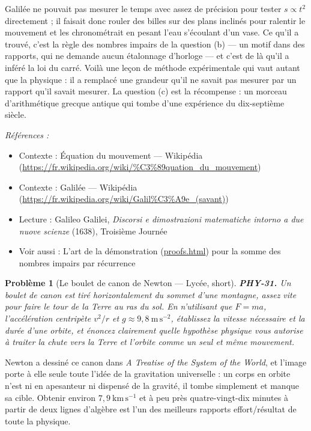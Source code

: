 \documentclass[11pt]{article}
\newtheorem{problem}{Problème}
\newenvironment{refs}{\par\small\noindent\emph{Références :}\begin{itemize}\setlength\itemsep{0pt}}{\end{itemize}\normalsize}
\begin{document}
\noindent Galilée ne pouvait pas mesurer le temps avec assez de précision pour tester
$ s \propto t^{2} $ directement ; il faisait donc rouler des billes sur des plans inclinés pour
ralentir le mouvement et les chronométrait en pesant l'eau s'écoulant d'un vase. Ce qu'il a
trouvé, c'est la règle des nombres impairs de la question (b) --- un motif dans des rapports, qui
ne demande aucun étalonnage d'horloge --- et c'est de là qu'il a inféré la loi du carré. Voilà une
leçon de méthode expérimentale qui vaut autant que la physique : il a remplacé une grandeur qu'il
ne savait pas mesurer par un rapport qu'il savait mesurer. La question (c) est la récompense : un
morceau d'arithmétique grecque antique qui tombe d'une expérience du dix-septième siècle.

\begin{refs}
\item Contexte : Équation du mouvement --- Wikipédia (\url{https://fr.wikipedia.org/wiki/%C3%89quation_du_mouvement})
\item Contexte : Galilée --- Wikipédia (\url{https://fr.wikipedia.org/wiki/Galil%C3%A9e_(savant)})
\item Lecture : Galileo Galilei, \textit{Discorsi e dimostrazioni matematiche intorno a due nuove scienze} (1638), Troisième Journée
\item Voir aussi : L'art de la démonstration (\url{proofs.html}) pour la somme des nombres impairs par récurrence
\end{refs}

\bigskip

\begin{problem}[{Le boulet de canon de Newton --- Lycée, short}]
\textbf{PHY-31.} Un boulet de canon est tiré horizontalement du sommet d'une
montagne, assez vite pour faire le tour de la Terre au ras du sol. En n'utilisant que
$ F = ma $, l'accélération centripète $ v^{2}/r $ et $ g \approx 9{,}8\ \mathrm{m\,s^{-2}} $,
établissez la vitesse nécessaire et la durée d'une orbite, et énoncez clairement quelle hypothèse
physique vous autorise à traiter la chute vers la Terre et l'orbite comme un seul et même
mouvement.
\end{problem}

\noindent Newton a dessiné ce canon dans \textit{A Treatise of the System of the World},
et l'image porte à elle seule toute l'idée de la gravitation universelle : un corps en orbite
n'est ni en apesanteur ni dispensé de la gravité, il tombe simplement et manque sa cible. Obtenir
environ $ 7{,}9\ \mathrm{km\,s^{-1}} $ et à peu près quatre-vingt-dix minutes à partir de deux
lignes d'algèbre est l'un des meilleurs rapports effort/résultat de toute la physique.
\end{document}
